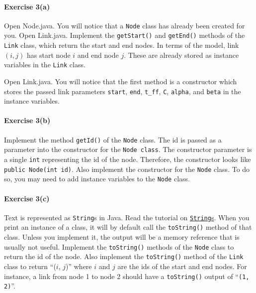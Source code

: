 \documentclass[12pt]{article}
\begin{document}
 
 \paragraph*{Exercise 3(a)} Open Node.java. You will notice that a \texttt{Node} class has already been created for you.
 Open Link.java. Implement the \texttt{getStart()} and \texttt{getEnd()} methods of the \texttt{Link} class, which return the start and end nodes. In terms of the model, link $(i,j)$ has start node $i$ and end node $j$. These are already stored as instance variables in the \texttt{Link} class. 
 
 \vspace{\baselineskip}

\noindent
Open Link.java. You will notice that the first method is a constructor which stores the passed link parameters \texttt{start}, \texttt{end}, \texttt{t\_ff}, \texttt{C}, \texttt{alpha}, and \texttt{beta} in the instance variables. 

\paragraph*{Exercise 3(b)} Implement the method \texttt{getId()} of the \texttt{Node} class. 
The id is passed as a parameter into the constructor for the \texttt{Node class}. The constructor parameter is a single \texttt{int} representing the id of the node. Therefore, the constructor looks like \texttt{public Node(int id)}. 
Also implement the constructor for the \texttt{Node} class. To do so, you may need to add instance variables to the \texttt{Node} class.


\paragraph*{Exercise 3(c)}
Text is represented as \texttt{String}s in Java. Read the tutorial on \href{https://www.w3schools.com/java/java_strings.asp}{\texttt{String}s}. 
When you print an instance of a class, it will by default call the \texttt{toString()} method of that class. Unless you implement it, the output will be a memory reference that is usually not useful. Implement the \texttt{toString()} methods of the \texttt{Node} class to return the id of the node. Also implement the \texttt{toString()} method of the \texttt{Link} class to return ``($i$, $j$)'' where $i$ and $j$ are the ids of the start and end nodes. For instance, a link from node 1 to node 2 should have a \texttt{toString()} output of ``\texttt{(1, 2)}''. 
% 
\end{document}
